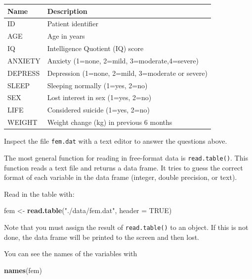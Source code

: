 \documentclass[
]{book}
\newenvironment{Shaded}{\begin{snugshade}}{\end{snugshade}}
\newcommand{\AttributeTok}[1]{\textcolor[rgb]{0.13,0.29,0.53}{#1}}
\newcommand{\ConstantTok}[1]{\textcolor[rgb]{0.56,0.35,0.01}{#1}}
\newcommand{\FunctionTok}[1]{\textcolor[rgb]{0.13,0.29,0.53}{\textbf{#1}}}
\newcommand{\NormalTok}[1]{#1}
\newcommand{\OtherTok}[1]{\textcolor[rgb]{0.56,0.35,0.01}{#1}}
\newcommand{\StringTok}[1]{\textcolor[rgb]{0.31,0.60,0.02}{#1}}
\newcounter{none} %
\theoremstyle{definition}
\theoremstyle{definition}
\theoremstyle{definition}
\theoremstyle{definition}
\theoremstyle{remark}
\begin{document}
{\def\LTcaptype{none} %
\begin{longtable}[]{@{}ll@{}}
\toprule\noalign{}
Name & Description \\
\midrule\noalign{}
\endhead
\bottomrule\noalign{}
\endlastfoot
ID & Patient identifier \\
AGE & Age in years \\
IQ & Intelligence Quotient (IQ) score \\
ANXIETY & Anxiety (1=none, 2=mild, 3=moderate,4=severe) \\
DEPRESS & Depression (1=none, 2=mild, 3=moderate or severe) \\
SLEEP & Sleeping normally (1=yes, 2=no) \\
SEX & Lost interest in sex (1=yes, 2=no) \\
LIFE & Considered suicide (1=yes, 2=no) \\
WEIGHT & Weight change (kg) in previous 6 months \\
\end{longtable}
}

Inspect the file \texttt{fem.dat} with a text editor to answer the
questions above.

The most general function for reading in free-format data is
\texttt{read.table()}. This function reads a text file and returns a
data frame. It tries to guess the correct format of each variable in
the data frame (integer, double precision, or text).

Read in the table with:

\begin{Shaded}
\begin{Highlighting}[]
\NormalTok{fem }\OtherTok{\textless{}{-}} \FunctionTok{read.table}\NormalTok{(}\StringTok{"./data/fem.dat"}\NormalTok{, }\AttributeTok{header =} \ConstantTok{TRUE}\NormalTok{)}
\end{Highlighting}
\end{Shaded}

Note that you must assign the result of \texttt{read.table()} to an
object. If this is not done, the data frame will be printed to the
screen and then lost.

You can see the names of the variables with

\begin{Shaded}
\begin{Highlighting}[]
\FunctionTok{names}\NormalTok{(fem)}
\end{Highlighting}
\end{Shaded}
\end{document}
